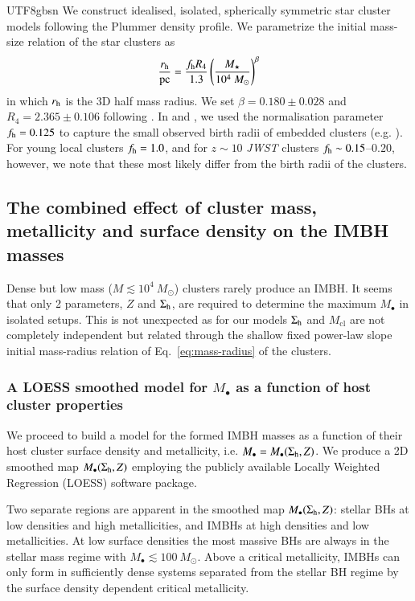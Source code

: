 \documentclass[trackchanges, twocolappendix, twocolumn]{aastex701}
\begin{document}
\begin{CJK*}{UTF8}{gbsn}
We construct idealised, isolated, spherically symmetric star cluster models following the Plummer \citep{Plummer1911} density profile. We parametrize the initial mass-size relation of the star clusters as
\begin{align}
\dfrac{r_{\rm h}}{\rm pc} = \dfrac{f_{\rm h} R_4}{1.3} \left( \dfrac{M_\star}{10^4~M_\odot} \right)^\beta
\label{eq:mass-radius}
\end{align}
in which $r_{\rm h}$ is the 3D half mass radius. We set $\beta = 0.180 \pm 0.028$ and $R_4 = 2.365 \pm 0.106$ following \cite{Brown&Gnedin2021StarCluster}. In \cite{Rantala2024b} and \cite{Rantala2025b}, we used the normalisation parameter $f_{\rm h} = 0.125$ to capture the small observed birth radii of embedded clusters (e.g. \citealt{Marks2012}). For young local clusters \citep{Brown2021} $f_{\rm h} = 1.0$, and for $z\sim10$ \textit{JWST} clusters \citep{Adamo2024} $f_{\rm h} \sim 0.15$--$0.20$, however, we note that these most likely differ from the birth radii of the clusters.

\subsection{The combined effect of cluster mass, metallicity and surface density on the IMBH masses}

Dense but low mass ($M \lesssim 10^4~M_\odot$) clusters rarely produce an IMBH. It seems that only 2 parameters, $Z$ and $\Sigma_{\rm h}$, are required to determine the maximum $M_\mathrm{\bullet}$ in isolated setups. This is not unexpected as for our models $\Sigma_{\rm h}$ and $M_\mathrm{cl}$ are not completely independent but related through the shallow fixed power-law slope initial mass-radius relation of Eq.~\ref{eq:mass-radius} of the clusters.

\subsubsection{A LOESS smoothed model for $M_\bullet$ as a function of host cluster properties}

We proceed to build a model for the formed IMBH masses as a function of their host cluster surface density and metallicity, i.e. $M_\bullet = M_\bullet (\Sigma_{\rm h}, Z)$. We produce a 2D smoothed map $M_\bullet (\Sigma_{\rm h}, Z)$ employing the publicly available Locally Weighted Regression (LOESS) software package.

Two separate regions are apparent in the smoothed map $M_\bullet (\Sigma_{\rm h}, Z)$: stellar BHs at low densities and high metallicities, and IMBHs at high densities and low metallicities. At low surface densities the most massive BHs are always in the stellar mass regime with $M_\bullet \lesssim 100~M_\odot$. Above a critical metallicity, IMBHs can only form in sufficiently dense systems separated from the stellar BH regime by the surface density dependent critical metallicity.


\end{CJK*}
\end{document}
